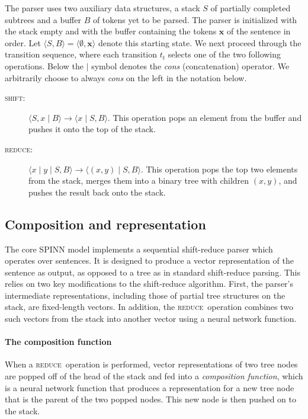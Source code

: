 \documentclass[11pt]{article}
\newcommand{\shift}{\textsc{shift}}
\newcommand{\reduce}{\textsc{reduce}}
\begin{document}
The parser uses two auxiliary data structures, a stack $S$ of partially completed subtrees and a buffer $B$ of tokens yet to be parsed. The parser is initialized with the stack empty and with the buffer containing the tokens $\mathbf x$ of the sentence in order. Let $\langle S, B \rangle = \langle \emptyset, \mathbf x \rangle$ denote this starting state. We next proceed through the transition sequence, where each transition $t_t$ selects one of the two following operations. Below the $\mid$ symbol denotes the \textit{cons} (concatenation) operator. We arbitrarily choose to always \textit{cons} on the left in the notation below.
\begin{description}
  \item[\shift:] $\langle S, x \mid B \rangle \to \langle x \mid S, B \rangle$. This operation pops an element from the buffer and pushes it onto the top of the stack.
  \item[\reduce:] $\langle x \mid y \mid S, B \rangle \to \langle (x, y) \mid S, B \rangle$. This operation pops the top two elements from the stack, merges them into a binary tree with children $(x, y)$, and pushes the result back onto the stack.
\end{description}

\subsection{Composition and representation}

The core SPINN model implements a sequential shift-reduce parser which operates over sentences. It is designed to produce a vector representation of the sentence as output, as opposed to a tree as in standard shift-reduce parsing. This relies on two key modifications to the shift-reduce algorithm. First, the parser's intermediate representations, including those of partial tree structures on the stack, are fixed-length vectors. In addition, the \reduce~operation combines two such vectors from the stack into another vector using a neural network function.

\paragraph{The composition function}
When a \reduce~operation is performed, vector representations of two tree nodes are popped off of the head of the stack and fed into a {\it composition function}, which is a neural network function that produces a representation for a new tree node that is the parent of the two popped nodes. This new node is then pushed on to the stack.
\end{document}
